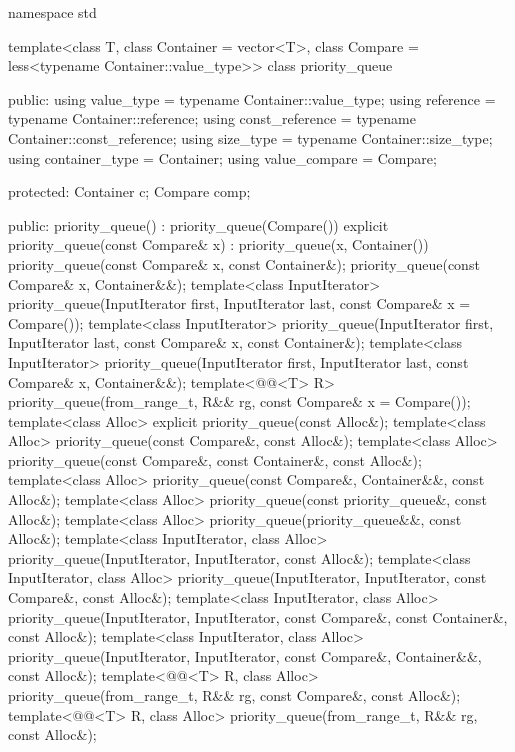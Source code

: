 \begin{codeblock}
namespace std {
  template<class T, class Container = vector<T>,
           class Compare = less<typename Container::value_type>>
  class priority_queue {
  public:
    using value_type      = typename Container::value_type;
    using reference       = typename Container::reference;
    using const_reference = typename Container::const_reference;
    using size_type       = typename Container::size_type;
    using container_type  = Container;
    using value_compare   = Compare;

  protected:
    Container c;
    Compare comp;

  public:
    priority_queue() : priority_queue(Compare()) {}
    explicit priority_queue(const Compare& x) : priority_queue(x, Container()) {}
    priority_queue(const Compare& x, const Container&);
    priority_queue(const Compare& x, Container&&);
    template<class InputIterator>
      priority_queue(InputIterator first, InputIterator last, const Compare& x = Compare());
    template<class InputIterator>
      priority_queue(InputIterator first, InputIterator last, const Compare& x,
                     const Container&);
    template<class InputIterator>
      priority_queue(InputIterator first, InputIterator last, const Compare& x,
                     Container&&);
    template<@@<T> R>
      priority_queue(from_range_t, R&& rg, const Compare& x = Compare());
    template<class Alloc> explicit priority_queue(const Alloc&);
    template<class Alloc> priority_queue(const Compare&, const Alloc&);
    template<class Alloc> priority_queue(const Compare&, const Container&, const Alloc&);
    template<class Alloc> priority_queue(const Compare&, Container&&, const Alloc&);
    template<class Alloc> priority_queue(const priority_queue&, const Alloc&);
    template<class Alloc> priority_queue(priority_queue&&, const Alloc&);
    template<class InputIterator, class Alloc>
      priority_queue(InputIterator, InputIterator, const Alloc&);
    template<class InputIterator, class Alloc>
      priority_queue(InputIterator, InputIterator, const Compare&, const Alloc&);
    template<class InputIterator, class Alloc>
      priority_queue(InputIterator, InputIterator, const Compare&, const Container&,
                     const Alloc&);
    template<class InputIterator, class Alloc>
      priority_queue(InputIterator, InputIterator, const Compare&, Container&&, const Alloc&);
    template<@@<T> R, class Alloc>
      priority_queue(from_range_t, R&& rg, const Compare&, const Alloc&);
    template<@@<T> R, class Alloc>
      priority_queue(from_range_t, R&& rg, const Alloc&);

}}
\end{codeblock}
